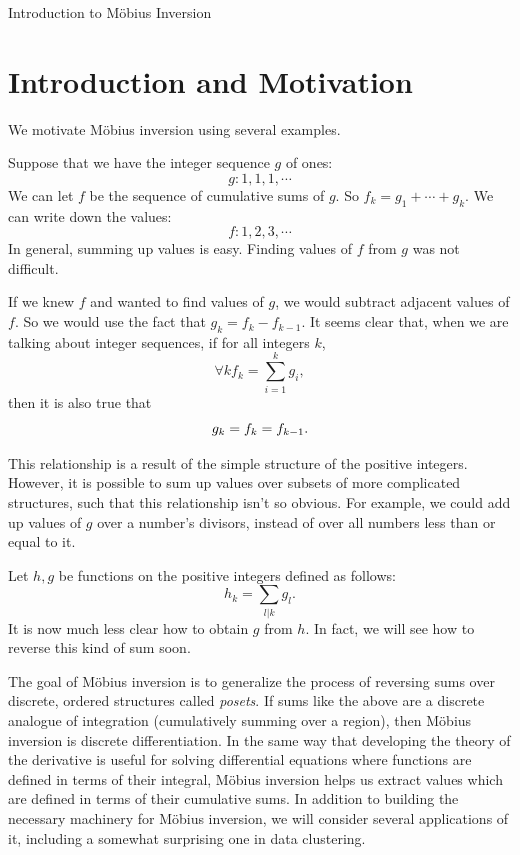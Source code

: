 \documentclass[12pt]{pom_thesis}
\begin{document}
\newpage
{}
\begin{chapter}{Introduction to M\"obius Inversion}\label{chap_intro}
\section{Introduction and Motivation}
We motivate M\"obius inversion using several examples.
\begin{examp}
Suppose that we have the integer sequence $g$ of ones:
\[
g : 1, 1, 1, \cdots
\]
We can let $f$ be the sequence of cumulative sums of $g$. So $f_k = g_1 + \cdots + g_k$. We can write down the values:
\[
f: 1,2,3,\cdots
\]
In general, summing up values is easy. Finding values of $f$ from $g$ was not difficult. 


If we knew $f$ and wanted to find values of $g$, we would subtract adjacent values of $f$. So we would use the fact that $g_k = f_k - f_{k-1}$. It seems clear that, when we are talking about integer sequences, if for all integers $k$,
\[
\forall k f_k = \sum_{i = 1}^k g_i,
\]
then it is also true that
\[\\
g_k = f_k = f_{k-1}.
\]
\end{examp}

This relationship is a result of the simple structure of the positive integers. However, it is possible to sum up values over subsets of more complicated structures, such that this relationship isn't so obvious. For example, we could add up values of $g$ over a number's divisors, instead of over all numbers less than or equal to it.
\begin{examp}
Let $h, g$ be functions on the positive integers defined as follows:
\[
h_k = \sum_{l|k}g_l.
\] 
It is now much less clear how to obtain $g$ from $h$. In fact, we will see how to reverse this kind of sum soon.
\end{examp}

The goal of M\"obius inversion is to generalize the process of reversing sums over discrete, ordered structures called \emph{posets}. If sums like the above are a discrete analogue of integration (cumulatively summing over a region), then M\"obius inversion is discrete differentiation. In the same way that developing the theory of the derivative is useful for solving differential equations where functions are defined in terms of their integral, M\"obius inversion helps us extract values which are defined in terms of their cumulative sums. In addition to building the necessary machinery for M\"obius inversion, we will consider several applications of it, including a somewhat surprising one in data clustering.

\end{chapter}
\end{document}
